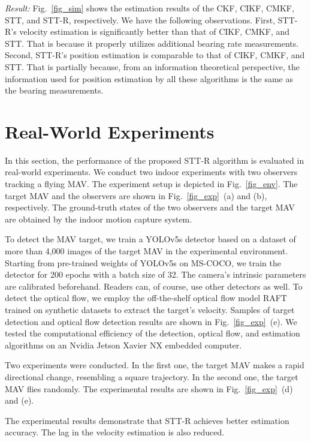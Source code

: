 \documentclass[letterpaper, 10 pt, conference]{ieeeconf}  %
\begin{document}
\emph{Result:}
Fig.~\ref{fig_sim} shows the estimation results of the CKF, CIKF, CMKF, STT, and STT-R, respectively.
We have the following observations. First, STT-R's velocity estimation is significantly better than that of CIKF, CMKF, and STT. That is because it properly utilizes additional bearing rate measurements. Second, STT-R's position estimation is comparable to that of CIKF, CMKF, and STT.
That is partially because, from an information theoretical perspective, the information used for position estimation by all these algorithms is the same as the bearing measurements.

\section{Real-World Experiments}\label{sec_exp}

In this section, the performance of the proposed STT-R algorithm is evaluated in real-world experiments. We conduct two indoor experiments with two observers tracking a flying MAV.
The experiment setup is depicted in Fig.~\ref{fig_env}. The target MAV and the observers are shown in Fig.~\ref{fig_exp}~(a) and (b), respectively. The ground-truth states of the two observers and the target MAV are obtained by the indoor motion capture system.

To detect the MAV target, we train a YOLOv5s detector based on a dataset of more than 4,000 images of the target MAV in the experimental environment. Starting from pre-trained weights of YOLOv5s on MS-COCO, we train the detector for 200 epochs with a batch size of 32. The camera's intrinsic parameters are calibrated beforehand. Readers can, of course, use other detectors as well.
To detect the optical flow, we employ the off-the-shelf optical flow model RAFT \cite{2020RAFT} trained on synthetic datasets \cite{raft-things} to extract the target's velocity.
Samples of target detection and optical flow detection results are shown in Fig.~\ref{fig_exp}~(e).
We tested the computational efficiency of the detection, optical flow, and estimation algorithms on an Nvidia Jetson Xavier NX embedded computer.

Two experiments were conducted. In the first one, the target MAV makes a rapid directional change, resembling a square trajectory. In the second one, the target MAV flies randomly. The experimental results are shown in Fig.~\ref{fig_exp}~(d) and (e).

The experimental results demonstrate that STT-R achieves better estimation accuracy. The lag in the velocity estimation is also reduced.
\end{document}
